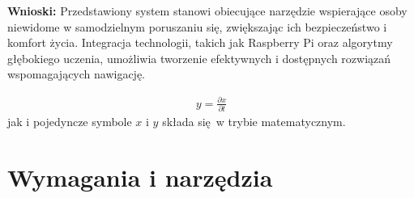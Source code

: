 \documentclass[a4paper,twoside,12pt]{book}
\newtheorem{Definition}{Definicja}
\newtheorem{Example}{Przykład}
\newtheorem{Theorem}{Twierdzenie}
\begin{document}
\textbf{Wnioski:}
Przedstawiony system stanowi obiecujące narzędzie wspierające osoby niewidome w samodzielnym poruszaniu się, zwiększając ich bezpieczeństwo i komfort życia. Integracja technologii, takich jak Raspberry Pi oraz algorytmy głębokiego uczenia, umożliwia tworzenie efektywnych i dostępnych rozwiązań wspomagających nawigację.






\begin{align}
y = \frac{\partial x}{\partial t}
\end{align}
jak i pojedyncze symbole $x$ i $y$  składa się w trybie matematycznym.


%
%





\chapter{Wymagania i narzędzia}
\label{ch:wymagania-i-narzedzia}
\end{document}
